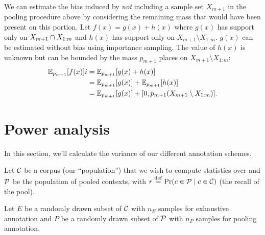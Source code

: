 We can estimate the bias induced by \textit{not} including a sample set $X_{m+1}$ in the pooling procedure above by considering the remaining mass that would have been present on this portion.
Let $f(x) = g(x) + h(x)$ where $g(x)$ has support only on $X_{m+1} \cap X_{1:m}$ and $h(x)$ has support only on $X_{m+1} \setminus X_{1:m}$.
$g(x)$ can be estimated without bias using importance sampling.
The value of $h(x)$ is unknown but can be bounded by the mass $p_{m+1}$ places on $X_{m+1} \setminus X_{1:m}$:
\begin{align*}
\mathbb{E}_{p_{m+1}}[f(x)] i
  &= \mathbb{E}_{p_{m+1}}[g(x) + h(x)] \\
  &= \mathbb{E}_{p_{m+1}}[g(x)] + \mathbb{E}_{p_{m+1}}[h(x)] \\
  &= \mathbb{E}_{p_{m+1}}[g(x)] + [0, p_{m+1}(X_{m+1} \setminus X_{1:m})].
\end{align*}

\section{Power analysis}
\label{sec:power}

In this section, we'll calculate the variance of our different annotation schemes.

\newcommand{\xh}{\hat{x}}
\newcommand{\xb}{\bar{x}}
\newcommand{\yh}{\hat{y}}
\newcommand{\yb}{\bar{y}}
\newcommand{\rh}{\hat{r}}
\newcommand{\ph}{\hat{p}}

Let $\mathcal{C}$ be a corpus (our ``population'') that we wish to compute statistics over
and $\mathcal{P}$ be the population of pooled contexts, 
  with $r \stackrel{\rm def}{=} \Pr(c \in \mathcal{P} \mid c \in \mathcal{C})$ (the recall of the pool).

Let $E$ be a randomly drawn subset of $\mathcal{C}$ with $n_E$ samples for exhaustive annotation and
    $P$ be a randomly drawn subset of $\mathcal{P}$ with $n_P$ samples for pooling annotation.


